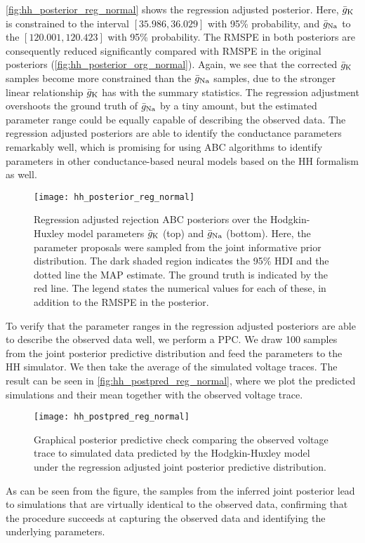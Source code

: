 \autoref{fig:hh_posterior_reg_normal} shows the regression adjusted posterior. Here, $\bar{g}_{\mathrm{K}}$ is constrained to the interval $[35.986, 36.029]$ with 95\% probability, and $\bar{g}_{\mathrm{Na}}$ to the $[120.001, 120.423]$ with 95\% probability. The RMSPE in both posteriors are consequently reduced significantly compared with RMSPE in the original posteriors (\autoref{fig:hh_posterior_org_normal}). Again, we see that the corrected $\bar{g}_{\mathrm{K}}$ samples become more constrained than the $\bar{g}_{\mathrm{Na}}$ samples, due to the stronger linear relationship $\bar{g}_{\mathrm{K}}$ has with the summary statistics. The regression adjustment overshoots the ground truth of $\bar{g}_{\mathrm{Na}}$ by a tiny amount, but the estimated parameter range could be equally capable of describing the observed data. The regression adjusted posteriors are able to identify the conductance parameters remarkably well, which is promising for using ABC algorithms to identify parameters in other conductance-based neural models based on the HH formalism as well. 
\begin{figure}[H]
    \centering
    \texttt{[image: hh\_posterior\_reg\_normal]}
    \caption{Regression adjusted rejection ABC posteriors over the Hodgkin-Huxley model parameters $\bar{g}_{\mathrm{K}}$ (top) and $\bar{g}_{\mathrm{Na}}$ (bottom). Here, the parameter proposals were sampled from the joint informative prior distribution. The dark shaded region indicates the 95\% HDI and the dotted line the MAP estimate. The ground truth is indicated by the red line. The legend states the numerical values for each of these, in addition to the RMSPE in the posterior.}
    \label{fig:hh_posterior_reg_normal}
\end{figure}

To verify that the parameter ranges in the regression adjusted posteriors are able to describe the observed data well, we perform a PPC. We draw 100 samples from the joint posterior predictive distribution and feed the parameters to the HH simulator. We then take the average of the simulated voltage traces. The result can be seen in \autoref{fig:hh_postpred_reg_normal}, where we plot the predicted simulations and their mean together with the observed voltage trace. 
\begin{figure}[!htb]
    \centering
    \texttt{[image: hh\_postpred\_reg\_normal]}
    \caption{Graphical posterior predictive check comparing the observed voltage trace to simulated data predicted by the Hodgkin-Huxley model under the regression adjusted joint posterior predictive distribution.}
    \label{fig:hh_postpred_reg_normal}
\end{figure}
As can be seen from the figure, the samples from the inferred joint posterior lead to simulations that are virtually identical to the observed data, confirming that the procedure succeeds at capturing the observed data and identifying the underlying parameters.


